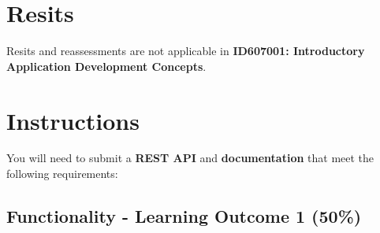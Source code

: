 \documentclass{article}
\begin{document}
\section*{Resits}
Resits and reassessments are not applicable in \textbf{ID607001: Introductory Application Development Concepts}. 

\newpage

\section*{Instructions}
You will need to submit a \textbf{REST API} and \textbf{documentation} that meet the following requirements: 

\subsection*{Functionality - Learning Outcome 1 (50\%)}
\end{document}

